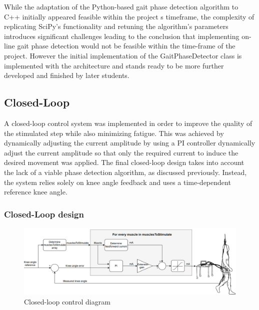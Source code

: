 While the adaptation of the Python-based gait phase detection algorithm to C++ initially appeared feasible within the project
s timeframe, the complexity of replicating SciPy's functionality and retuning the algorithm's parameters introduces significant challenges leading to the conclusion that implementing on-line gait phase detection would not be feasible within the time-frame of the project. However the initial implementation of the GaitPhaseDetector class is implemented with the architecture and stands ready to be more further developed and finished by later students.

\subsection{Closed-Loop}
A closed-loop control system was implemented in order to improve the quality of the stimulated step while also minimizing fatigue. This was achieved by dynamically adjusting the current amplitude by using a  PI controller dynamically adjust the current amplitude so that only the required current to induce the desired movement was applied. The final closed-loop design takes into account the lack of a viable phase detection algorithm, as discussed previously. Instead, the system relies solely on knee angle feedback and uses a time-dependent reference knee angle.

\subsubsection{Closed-Loop design}

\begin{figure} [H]
    \centering
    \includegraphics[width=0.98\linewidth]{images/controldiam3.png}
    \caption{Closed-loop control diagram}
    \label{fig:enter-label}
\end{figure}

